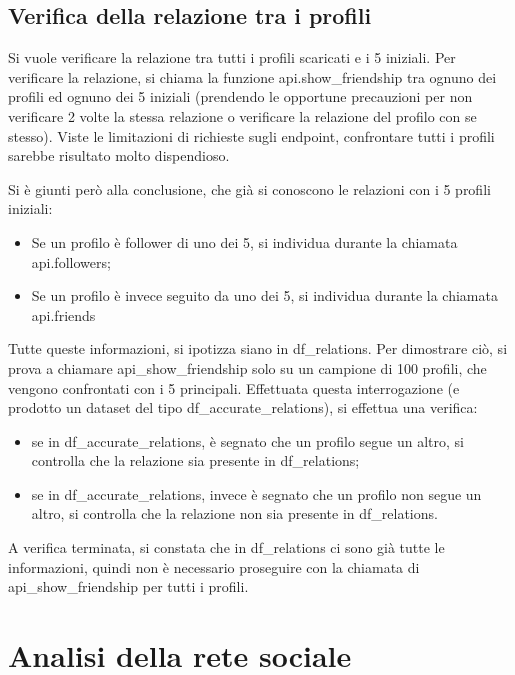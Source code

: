 \documentclass[a4paper, 12pt, twoside]{article}
\begin{document}
\subsection{Verifica della relazione tra i profili}
Si vuole verificare la relazione tra tutti i profili scaricati e i 5 iniziali. Per verificare la relazione, si chiama la funzione api.show\_friendship tra ognuno dei profili ed ognuno dei 5 iniziali (prendendo le opportune precauzioni per non verificare 2 volte la stessa relazione o verificare la relazione del profilo con se stesso). Viste le limitazioni di richieste sugli endpoint, confrontare tutti i profili sarebbe risultato molto dispendioso.

Si è giunti però alla conclusione, che già si conoscono le relazioni con i 5 profili iniziali:
\begin{itemize}
    \item Se un profilo è follower di uno dei 5, si individua durante la chiamata api.followers;
    \item Se un profilo è invece seguito da uno dei 5, si individua durante la chiamata api.friends
\end{itemize}
Tutte queste informazioni, si ipotizza siano in df\_relations. Per dimostrare ciò, si prova a chiamare api\_show\_friendship solo su un campione di 100 profili, che vengono confrontati con i 5 principali. Effettuata questa interrogazione (e prodotto un dataset del tipo df\_accurate\_relations), si effettua una verifica:
\begin{itemize}
    \item se in df\_accurate\_relations, è segnato che un profilo segue un altro, si controlla che la relazione sia presente in df\_relations;
    \item se in df\_accurate\_relations, invece è segnato che un profilo non segue un altro, si controlla che la relazione non sia presente in df\_relations.
\end{itemize}
A verifica terminata, si constata che in df\_relations ci sono già tutte le informazioni, quindi non è necessario proseguire con la chiamata di api\_show\_friendship per tutti i profili.


\section{Analisi della rete sociale} \label{sec:analisi_rete}
\end{document}
